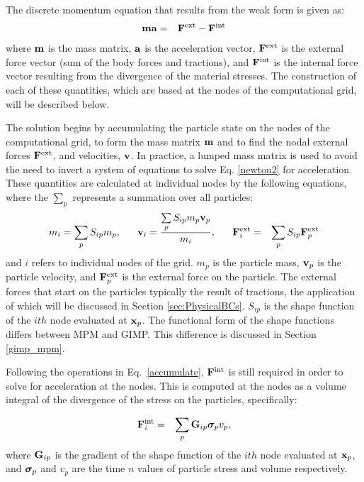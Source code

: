 The discrete momentum equation that results from the weak form is given as:
\begin{eqnarray}
        \bfm \bfa &=& \bfF^{\rm{ext}} - \bfF^{\rm{int}}  \label{newton2}
\end{eqnarray}
where $\bfm$ is the mass matrix, $\bfa$ is the acceleration vector,
$\bfF^{\rm{ext}}$ is the external force vector (sum of the body forces and
tractions), and $\bfF^{\rm{int}}$ is the internal force vector resulting from
the divergence of the material stresses.  The construction of each of these
quantities, which are based at the nodes of the computational grid,
will be described below.

The solution begins by accumulating the particle state on the
nodes of the computational grid, to form the mass matrix $\bfm$ and to find
the nodal external forces $\bfF^{\rm{ext}}$, and velocities,
$\bfv$.  In practice, a lumped mass matrix is used to avoid the need to
invert a system of equations to solve Eq. \ref{newton2} for acceleration.
These quantities are calculated at individual nodes by the following equations,
where the $\sum\limits_{p}$ represents a summation over all particles:
\begin{eqnarray}
m_i = \sum_{p} S_{ip} m_p,  \;\;\;\;\;\; 
\bfv_i = \frac{\sum\limits_{p} S_{ip} m_p \bfv_p}{m_i},  \;\;\;\;\;\;
\bfF^{\rm{ext}}_i &=& \sum_{p} S_{ip} \bfF^{\rm{ext}}_p
\label{accumulate}
\end{eqnarray}
and $i$ refers to individual nodes of the grid.  $m_p$ is the particle
mass, $\bfv_p$ is the particle velocity, and $\bfF^{\rm{ext}}_p$ is the
external force on the particle.  The external forces that start on the
particles typically the result of tractions, the application of which will
be discussed in Section \ref{sec:PhysicalBCs}.
$S_{ip}$ is the shape function of the $ith$ node evaluated at $\bfx_p$.
The functional form of the shape functions differs between MPM and GIMP.
This difference is discussed in Section \ref{gimp_mpm}.

Following the operations in Eq.~\ref{accumulate}, $\bfF^{\rm{int}}$
is still required in order to solve for acceleration at the nodes.
This is computed at the nodes as a volume integral of the divergence
of the stress on the particles, specifically:

\begin{eqnarray}
\bfF^{\rm{int}}_i &=& \sum_{p} \bfG_{ip} \sig_p v_p,
\label{computeIntForce}  
\end{eqnarray}
where $\bfG_{ip}$ is the gradient of the shape function of the $ith$ node
evaluated at $\bfx_p$, and $\sig_p$ and $v_p$ are the time $n$ values of
particle stress and volume respectively.  

